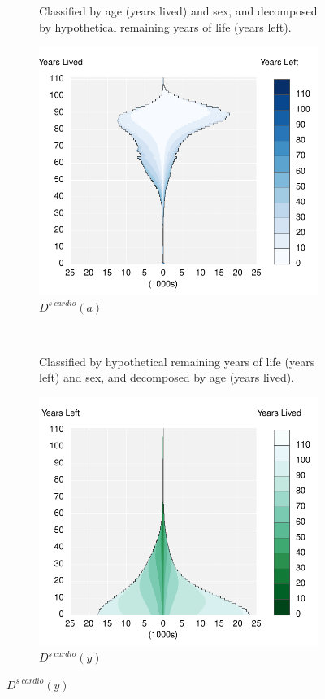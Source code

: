 \documentclass{article}
\begin{document}
\begin{figure}
\centering
\caption{Deaths from cardiovascular causes in the USA, 2010}
\label{fig:5}
\begin{subfigure}[b]{.48\linewidth}
\centering
	\caption{Classified by age (years lived) and sex, and decomposed
by hypothetical remaining years of life (years left).}
	\label{fig:Dayc}
	\includegraphics[scale=.55]{Figures/Deathsxy10USACardio.pdf}	
	\caption*{$D^{s~cardio}(a)$}
\end{subfigure}
~
\begin{subfigure}[b]{.48\linewidth}
\centering
    \caption{Classified by hypothetical remaining years of life
(years left) and sex, and decomposed by age (years lived).}
	\label{fig:Dyac}
    \includegraphics[scale=.55]{Figures/Deathsyx10USACardio.pdf}
    \caption*{$D^{s~cardio}(y)$ }
\end{subfigure}
\end{figure}
\end{document}
